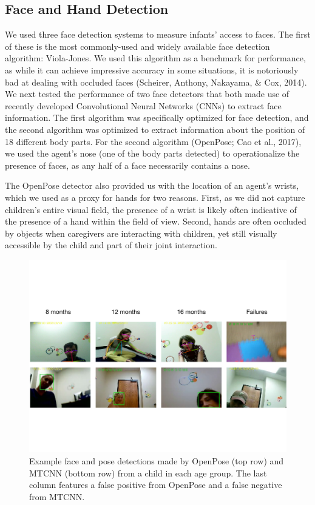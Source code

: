 \documentclass[10pt, letterpaper]{article}
\begin{document}
\subsection{Face and Hand Detection}\label{face-and-hand-detection}

We used three face detection systems to measure infants' access to
faces. The first of these is the most commonly-used and widely available
face detection algorithm: Viola-Jones. We used this algorithm as a
benchmark for performance, as while it can achieve impressive accuracy
in some situations, it is notoriously bad at dealing with occluded faces
(Scheirer, Anthony, Nakayama, \& Cox, 2014). We next tested the
performance of two face detectors that both made use of recently
developed Convolutional Neural Networks (CNNs) to extract face
information. The first algorithm was specifically optimized for face
detection, and the second algorithm was optimized to extract information
about the position of 18 different body parts. For the second algorithm
(OpenPose; Cao et al., 2017), we used the agent's nose (one of the body
parts detected) to operationalize the presence of faces, as any half of
a face necessarily contains a nose.

The OpenPose detector also provided us with the location of an agent's
wrists, which we used as a proxy for hands for two reasons. First, as we
did not capture children's entire visual field, the presence of a wrist
is likely often indicative of the presence of a hand within the field of
view. Second, hands are often occluded by objects when caregivers are
interacting with children, yet still visually accessible by the child
and part of their joint interaction.

\begin{figure}
\centering
\includegraphics[width=5.5in]{images/detector_samples_banner.pdf}
\caption{\label{fig:frames} Example face and pose detections made by OpenPose (top row) and MTCNN (bottom row) from a child in each age group. The last column features a false positive from OpenPose and a false negative from MTCNN.}
\end{figure}
\end{document}
